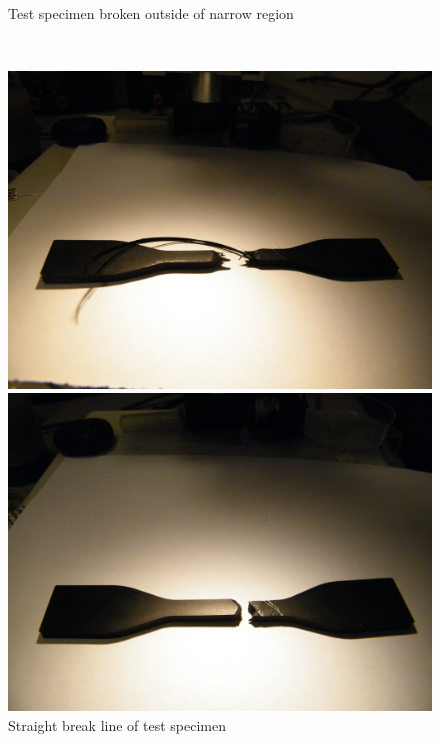 \documentclass[a4paper, 11pt, reqno]{report}
\begin{document}
\begin{figure}[h!]
\begin{minipage}[b]{0.48\textwidth}
  \end{minipage}
  \\[1pt]
  \begin{minipage}[t]{0.48\textwidth}
    \caption{Test specimen broken outside of narrow region}
  \end{minipage}
  \hfill
  \begin{minipage}[t]{0.48\textwidth}
    \caption{Straight break line of test specimen}
  \end{minipage}
  \hfill
  \\[20pt]
   \begin{minipage}[b]{0.48\textwidth}
    \includegraphics[width=\textwidth]{6}
  \end{minipage}
  \hfill
  \begin{minipage}[b]{0.48\textwidth}
    \includegraphics[width=\textwidth]{4}

\end{minipage}
\end{figure}
\end{document}
